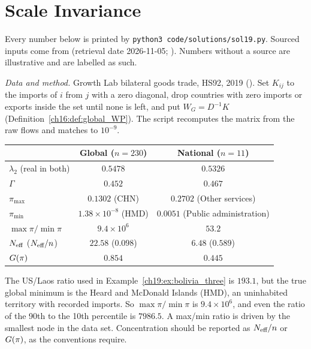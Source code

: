 \documentclass[../solutions_manual.tex]{subfiles}
\begin{document}
\ifSubfilesClassLoaded{\setcounter{chapter}{18}}{}%
\setcounter{chapter}{18}%
\chapter{Scale Invariance}\label{sol19}

Every number below is printed by \texttt{python3 code/solutions/sol19.py}. Sourced inputs come from  (retrieval date 2026-11-05; ). Numbers without a source are illustrative and are labelled as such.


 \emph{Data and method.} Growth Lab bilateral goods trade, HS92, 2019 (). Set $K_{ij}$ to the imports of $i$ from $j$ with a zero diagonal, drop countries with zero imports or exports inside the set until none is left, and put $W_G = D^{-1}K$ (Definition~\ref{ch16:def:global_WP}). The script recomputes the matrix from the raw flows and matches  to $10^{-9}$.
\begin{center}\small
\begin{tabular}{lcc}
\toprule
& Global ($n = 230$) & National ($n = 11$) \\
\midrule
$\lambda_2$ (real in both) & $0.5478$ & $0.5326$ \\
$\Gamma$ & $0.452$ & $0.467$ \\
$\pi_{\max}$ & $0.1302$ (CHN) & $0.2702$ (Other services) \\
$\pi_{\min}$ & $1.38\times10^{-8}$ (HMD) & $0.0051$ (Public administration) \\
$\max\pi/\min\pi$ & $9.4\times10^{6}$ & $53.2$ \\
$N_{\text{eff}}$ ($N_{\text{eff}}/n$) & $22.58$ ($0.098$) & $6.48$ ($0.589$) \\
$G(\pi)$ & $0.854$ & $0.445$ \\
\bottomrule
\end{tabular}
\end{center}
The US/Laos ratio used in Example~\ref{ch19:ex:bolivia_three} is $193.1$, but the true global minimum is the Heard and McDonald Islands (HMD), an uninhabited territory with recorded imports. So $\max\pi/\min\pi$ is $9.4\times10^6$, and even the ratio of the 90th to the 10th percentile is $7986.5$. A max/min ratio is driven by the smallest node in the data set. Concentration should be reported as $N_{\text{eff}}/n$ or $G(\pi)$, as the conventions require.
\end{document}
